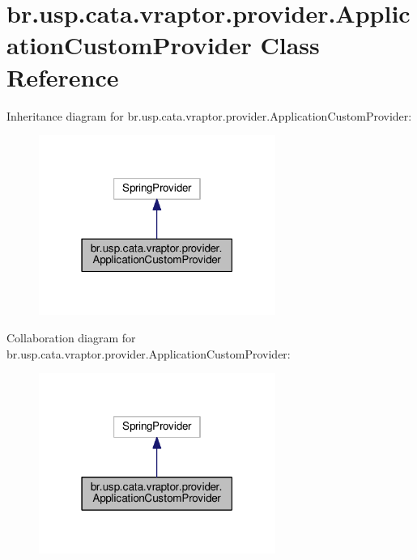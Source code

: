 \hypertarget{classbr_1_1usp_1_1cata_1_1vraptor_1_1provider_1_1_application_custom_provider}{\section{br.\+usp.\+cata.\+vraptor.\+provider.\+Application\+Custom\+Provider Class Reference}
\label{classbr_1_1usp_1_1cata_1_1vraptor_1_1provider_1_1_application_custom_provider}
}


Inheritance diagram for br.\+usp.\+cata.\+vraptor.\+provider.\+Application\+Custom\+Provider\+:\nopagebreak
\begin{figure}[H]
\begin{center}
\leavevmode
\includegraphics[width=219pt]{classbr_1_1usp_1_1cata_1_1vraptor_1_1provider_1_1_application_custom_provider__inherit__graph}
\end{center}
\end{figure}


Collaboration diagram for br.\+usp.\+cata.\+vraptor.\+provider.\+Application\+Custom\+Provider\+:\nopagebreak
\begin{figure}[H]
\begin{center}
\leavevmode
\includegraphics[width=219pt]{classbr_1_1usp_1_1cata_1_1vraptor_1_1provider_1_1_application_custom_provider__coll__graph}
\end{center}
\end{figure}
